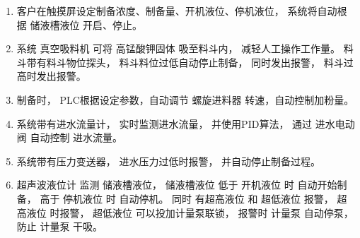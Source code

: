 \begin{enumerate}
\item 客户在触摸屏设定制备浓度、制备量、开机液位、停机液位，
  系统将自动根据 储液槽液位 开启、停止。
\item 系统 真空吸料机 可将 高锰酸钾固体 吸至料斗内，
  减轻人工操作工作量。
  料斗带有料斗物位探头，
  料斗料位过低自动停止制备，
  同时发出报警，
  料斗过高时发出报警。
\item 制备时， PLC根据设定参数，自动调节 螺旋进料器 转速，自动控制加粉量。
\item 系统带有进水流量计，
  实时监测进水流量，
  并使用PID算法，
  通过 进水电动阀 自动控制 进水流量。
\item 系统带有压力变送器，
  进水压力过低时报警，
  并自动停止制备过程。
\item 超声波液位计 监测 储液槽液位，
    储液槽液位 低于 开机液位 时 自动开始制备，
    高于 停机液位 时 自动停机。
    同时 有超高液位 和 超低液位 报警，
    超高液位 时报警，
    超低液位 可以投加计量泵联锁，
    报警时 计量泵 自动停泵，
    防止 计量泵 干吸。
\end{enumerate}



